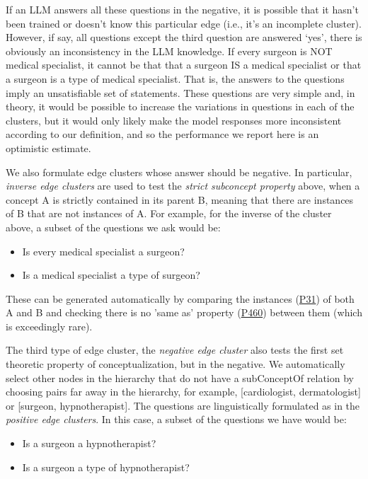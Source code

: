 \documentclass{article} %
\begin{document}
If an LLM answers all these questions in the negative, it is possible that it hasn't been trained or doesn't know this particular edge (i.e., it's an incomplete cluster). However, if say, all questions except the third question are answered `yes', there is obviously an inconsistency in the LLM knowledge. If every surgeon is NOT medical specialist, it cannot be that that a surgeon IS a medical specialist or that a surgeon is a type of medical specialist. That is, the answers to the questions imply an unsatisfiable set of statements. These questions are very simple and, in theory, it would be possible to increase the variations in questions in each of the clusters, but it would only likely make the model responses more inconsistent according to our definition, and so the performance we report here is an optimistic estimate.

We also formulate edge clusters whose answer should be negative. In particular, {\em inverse edge clusters} are used to test the {\em strict subconcept property} above, when a concept A is strictly contained in its parent B, meaning that there are instances of B that are not instances of A. For example, for the inverse of the cluster above, a subset of the questions we ask would be:
\begin{itemize}
\item Is every medical specialist a surgeon?
\item Is a medical specialist a type of surgeon?
\end{itemize} 

These can be generated automatically by comparing the instances (\href{https://www.wikidata.org/wiki/Property:P31}{P31}) of both A and B and checking there is no 'same as' property (\href{https://www.wikidata.org/wiki/Property:P460}{P460}) between them (which is exceedingly rare).

The third type of edge cluster, the {\em negative edge cluster} also tests the first set theoretic property of conceptualization, but in the negative. We automatically select other nodes in the hierarchy that do not have a subConceptOf relation by choosing pairs far away in the hierarchy, for example, [cardiologist, dermatologist] or [surgeon, hypnotherapist]. The questions are linguistically formulated as in the {\em positive edge clusters}. In this case, a subset of the questions we have would be:
\begin{itemize}
\item Is a surgeon a hypnotherapist?
\item Is a surgeon a type of hypnotherapist?
\end{itemize}
\end{document}
